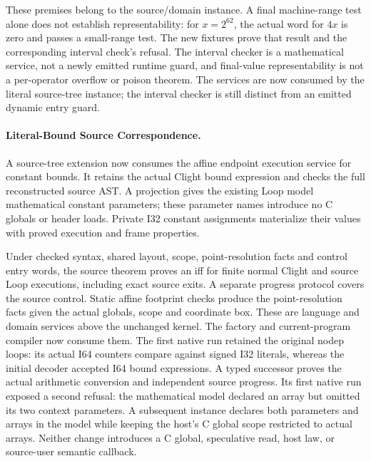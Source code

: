 These premises belong to the source/domain instance. A final machine-range test
alone does not establish representability: for $x=2^{62}$, the actual word for
$4x$ is zero and passes a small-range test. The new fixtures prove that result
and the corresponding interval check's refusal. The interval checker is a
mathematical service, not a newly emitted runtime guard, and final-value
representability is not a per-operator overflow or poison theorem. The services
are now consumed by the literal source-tree instance; the interval checker is
still distinct from an emitted dynamic entry guard.

\paragraph{Literal-Bound Source Correspondence.}
A source-tree extension now consumes the affine endpoint execution service for
constant bounds. It retains the actual Clight bound expression and checks the
full reconstructed source AST. A projection gives the existing Loop model
mathematical constant parameters; these parameter names introduce no C globals
or header loads. Private I32 constant assignments materialize their values with
proved execution and frame properties.

Under checked syntax, shared layout, scope, point-resolution facts and control
entry words, the source theorem proves an iff for finite normal Clight and
source Loop executions, including exact source exits. A separate progress
protocol covers the source control. Static affine footprint checks produce the
point-resolution facts given the actual globals, scope and coordinate box.
These are language and domain services above the unchanged kernel. The factory
and current-program compiler now consume them. The first native run retained
the original nodep loops: its actual I64 counters compare against signed I32
literals, whereas the initial decoder accepted I64 bound expressions. A typed
successor proves the actual arithmetic conversion and independent source
progress. Its first native run exposed a second refusal: the mathematical model
declared an array but omitted its two context parameters. A subsequent instance
declares both parameters and arrays in the model while keeping the host's C
global scope restricted to actual arrays. Neither change introduces a C global,
speculative read, host law, or source-user semantic callback.

